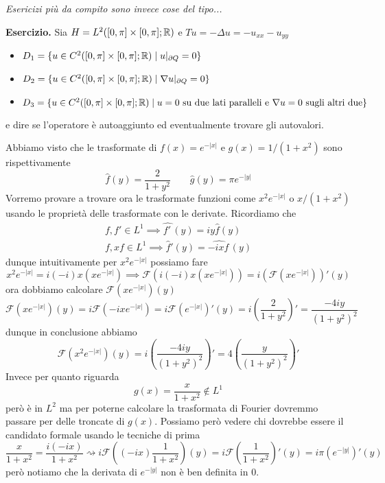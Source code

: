 \textit{Esericizi più da compito sono invece cose del tipo...}

\textbf{Esercizio.}
Sia $H = L^2([0, \pi] \times [0, \pi]; \mathbb R)$ e $T u = -\Delta u = -u_{xx} -u_{yy}$
\begin{itemize}
	\item $D_1 = \{ u \in C^2([0, \pi] \times [0, \pi]; \mathbb R) \mid u|_{\partial Q} = 0 \}$
	\item $D_2 = \{ u \in C^2([0, \pi] \times [0, \pi]; \mathbb R) \mid \nabla u|_{\partial Q} = 0 \}$
	\item $D_3 = \{ u \in C^2([0, \pi] \times [0, \pi]; \mathbb R) \mid \text{$u = 0$ su due lati paralleli e $\nabla u = 0$ sugli altri due} \}$
\end{itemize}
e dire se l'operatore è autoaggiunto ed eventualmente trovare gli autovalori.


Abbiamo visto che le trasformate di $f(x) = e^{-|x|}$ e $g(x) = 1 / (1 + x^2)$ sono rispettivamente
$$
\hat f(y) = \frac{2}{1 + y^2}
\qquad
\hat g(y) = \pi e^{-|y|}
$$
Vorremo provare a trovare ora le trasformate funzioni come $x^2 e^{-|x|}$ o $x / (1 + x^2)$ usando le proprietà delle trasformate con le derivate. Ricordiamo che
$$
\begin{gathered}
	f, f' \in L^1 \implies \hat{f'\,}(y) = i y \hat f(y) \\
	f, x f \in L^1 \implies \hat{f}'(y) = \hat{-i x f\,}(y)
\end{gathered}
$$
dunque intuitivamente per $x^2 e^{-|x|}$ possiamo fare
$$
x^2 e^{-|x|} = i (-i) x (x e^{-|x|}) \implies \mathcal F(i (-i) x (x e^{-|x|})) = i (\mathcal F(x e^{-|x|}))'(y)
$$
ora dobbiamo calcolare $\mathcal F(x e^{-|x|})(y)$
$$
\mathcal F(x e^{-|x|})(y) = i \mathcal F(-ix e^{-|x|}) = i \mathcal F(e^{-|x|})'(y) = i \left(\frac{2}{1 + y^2}\right)' = \frac{-4iy}{(1+y^2)^2}
$$
dunque in conclusione abbiamo
$$
\mathcal F(x^2 e^{-|x|})(y) = i \left(\frac{-4iy}{(1 + y^2)^2}\right)' = 4 \left(\frac{y}{(1 + y^2)^2}\right)'
$$
Invece per quanto riguarda
$$
g(x) = \frac{x}{1+x^2} \notin L^1
$$
però è in $L^2$ ma per poterne calcolare la trasformata di Fourier dovremmo passare per delle troncate di $g(x)$. Possiamo però vedere chi dovrebbe essere il candidato formale usando le tecniche di prima
$$
\frac{x}{1+x^2} = \frac{i (-ix)}{1+x^2} \rightsquigarrow 
i \mathcal F \left( (-ix) \frac{1}{1+x^2} \right)(y)
= i \mathcal F \left( \frac{1}{1+x^2} \right)'(y) = i \pi (e^{-|y|})'(y)
$$
però notiamo che la derivata di $e^{-|y|}$ non è ben definita in $0$.


